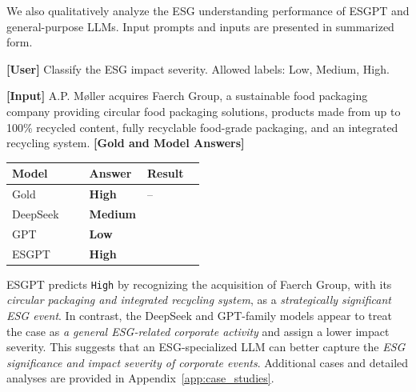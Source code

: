 \documentclass[11pt]{article}
\newcommand{\cmarkblue}{\textcolor{caseblue}{\ding{51}}}
\newcommand{\xmarkred}{\textcolor{casered}{\ding{55}}}
\newcommand{\goldans}[1]{\textbf{#1}}
\newcommand{\correctans}[1]{\textcolor{caseblue}{\textbf{#1}}}
\newcommand{\wrongans}[1]{\textcolor{casered}{\textbf{#1}}}
\begin{document}
We also qualitatively analyze the ESG understanding performance of \textsf{ESGPT} and general-purpose LLMs. Input prompts and inputs are presented in summarized form.
\begin{maincasebox}
\small
\textbf{[User]} 
Classify the ESG impact severity. \newline Allowed labels: Low, Medium, High.
\vspace{0.45em}

\textbf{[Input]} A.P. Møller acquires Faerch Group, a sustainable food packaging company providing circular food packaging solutions, products made from up to 100\% recycled content, fully recyclable food-grade packaging, and an integrated recycling system.
\tcblower
\scriptsize
\textbf{[Gold and Model Answers]}
\vspace{0.15em}

\setlength{\tabcolsep}{2.5pt}
\renewcommand{\arraystretch}{1.02}
\begin{tabularx}{1.0\linewidth}{@{}Y C{0.30\linewidth} C{0.30\linewidth}@{}}
\hline
\textbf{Model} & \textbf{Answer} & \textbf{Result} \\
\hline
Gold & \goldans{High} & -- \\
\hline
DeepSeek & \wrongans{Medium} & \xmarkred \\
GPT & \wrongans{Low} & \xmarkred \\
\textsf{ESGPT} & \correctans{High} & \cmarkblue \\
\hline
\end{tabularx}
\end{maincasebox}
\textsf{ESGPT} predicts \texttt{High} by recognizing the acquisition of Faerch Group, with its \textit{circular packaging and integrated recycling system}, as a \textit{strategically significant ESG event}. In contrast, the DeepSeek and GPT-family models appear to treat the case as \textit{a general ESG-related corporate activity} and assign a lower impact severity. This suggests that an ESG-specialized LLM can better capture the \textit{ESG significance and impact severity of corporate events}. 
Additional cases and detailed analyses are provided in Appendix~\ref{app:case_studies}.
\end{document}
